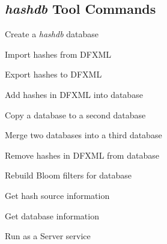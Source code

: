 \documentclass[12pt,twoside]{article}
\newcommand{\hdb}{\emph{hashdb}\xspace}
\begin{document}
\subsection{\hdb Tool Commands}
\begin{compactitem}
\item Create a \hdb database
\item Import hashes from DFXML
\item Export hashes to DFXML
\item Add hashes in DFXML into database
\item Copy a database to a second database
\item Merge two databases into a third database
\item Remove hashes in DFXML from database
\item Rebuild Bloom filters for database
\item Get hash source information
\item Get database information
\item Run as a Server service
\end{compactitem}
\end{document}
